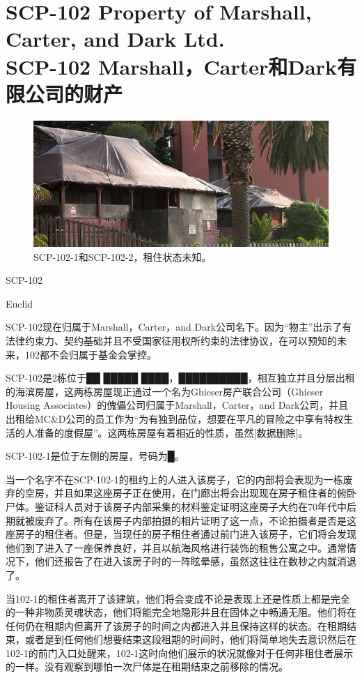 \chapter[SCP-102 Marshall，Carter和Dark有限公司的财产]{
    SCP-102 Property of Marshall, Carter, and Dark Ltd.\\
    SCP-102 Marshall，Carter和Dark有限公司的财产
}

\label{chap:SCP-102}

\begin{figure}[H]
    \centering
    \includegraphics[width=0.5\linewidth]{images/SCP.102.png}
    \caption*{SCP-102-1和SCP-102-2，租住状态未知。}
\end{figure}

SCP-102

Euclid

SCP-102现在归属于Marshall，Carter，and Dark公司名下。因为“物主”出示了有法律约束力、契约基础并且不受国家征用权所约束的法律协议，在可以预知的未来，102都不会归属于基金会掌控。

SCP-102是2栋位于██ █████ ████，██████████，相互独立并且分层出租的海滨房屋，这两栋房屋现正通过一个名为Ghieser房产联合公司（Ghieser Housing Associates）的傀儡公司归属于Marshall，Carter，and Dark公司，并且出租给MC\&D公司的员工作为“为有独到品位，想要在平凡的冒险之中享有特权生活的人准备的度假屋”。这两栋房屋有着相近的性质，虽然{[}数据删除]。

SCP-102-1是位于左侧的房屋，号码为█。

当一个名字不在SCP-102-1的租约上的人进入该房子，它的内部将会表现为一栋废弃的空房，并且如果这座房子正在使用，在门廊出将会出现现在房子租住者的俯卧尸体。鉴证科人员对于该房子内部采集的材料鉴定证明这座房子大约在70年代中后期就被废弃了。所有在该房子内部拍摄的相片证明了这一点，不论拍摄者是否是这座房子的租住者。但是，当现任的房子租住者通过前门进入该房子，它们将会发现他们到了进入了一座保养良好，并且以航海风格进行装饰的租售公寓之中。通常情况下，他们还报告了在进入该房子时的一阵眩晕感，虽然这往往在数秒之内就消退了。

当102-1的租住者离开了该建筑，他们将会变成不论是表现上还是性质上都是完全的一种非物质灵魂状态，他们将能完全地隐形并且在固体之中畅通无阻。他们将在任何仍在租期内但离开了该房子的时间之内都进入并且保持这样的状态。在租期结束，或者是到任何他们想要结束这段租期的时间时，他们将简单地失去意识然后在102-1的前门入口处醒来，102-1这时向他们展示的状况就像对于任何非租住者展示的一样。没有观察到哪怕一次尸体是在租期结束之前移除的情况。

